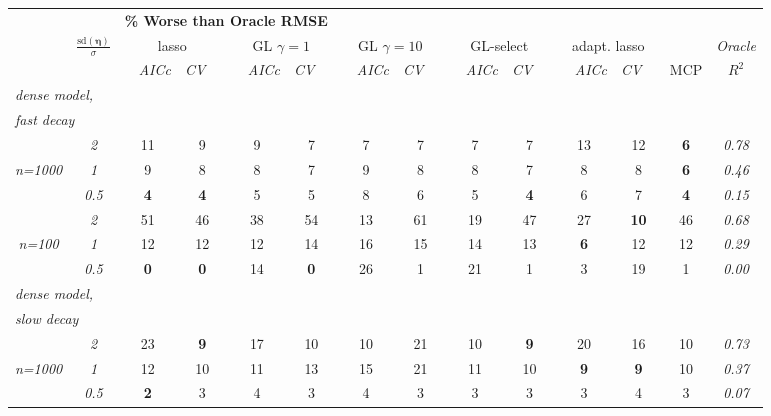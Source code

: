 \documentclass[12pt]{article}
\begin{document}
\begin{table}
\footnotesize
\begin{center}
\begin{tabular}{cc|cc|cc|cc|cc|cc|c|c}
& & \multicolumn{11}{l|}{\bf \% Worse than Oracle RMSE } & \\[1ex]
& \multirow{2}{*}{$\displaystyle\frac{\mathrm{sd}(\boldsymbol{\eta})}{\sigma}$} 
& \multicolumn{2}{c}{lasso} 
& \multicolumn{2}{c}{GL $\gamma=1$} 
& \multicolumn{2}{c}{GL $\gamma=10$} 
& \multicolumn{2}{c}{GL-select} 
& \multicolumn{2}{c}{ adapt. lasso} 
& \multicolumn{1}{c|}{~} & \it Oracle \\[-0.5ex]
& 
& ~~\scriptsize\it AICc & \multicolumn{1}{c}{\scriptsize\it CV~~}
& ~~\scriptsize\it AICc & \multicolumn{1}{c}{\scriptsize\it CV~~}
& ~~\scriptsize\it AICc & \multicolumn{1}{c}{\scriptsize\it CV~~}
& ~~\scriptsize\it AICc & \multicolumn{1}{c}{\scriptsize\it CV~~}
& ~~\scriptsize\it AICc & \multicolumn{1}{c}{\scriptsize\it CV~~} 
& \multicolumn{1}{c|}{ MCP} & $R^2$ \\[1ex]
\hline
\multicolumn{2}{l|}{\it dense model,} &&&&&&&&&&&\\
\multicolumn{2}{l|}{\it fast decay} &&&&&&&&&&&\\& \it  2  & 11 & 9 & 9 & 7 & 7 & 7 & 7 & 7 & 13 & 12 & {\bf 6} & \it  0.78 \\
\it n=1000  & \it  1  & 9 & 8 & 8 & 7 & 9 & 8 & 8 & 7 & 8 & 8 & {\bf 6} & \it  0.46 \\
& \it  0.5  & {\bf 4} & {\bf 4} & 5 & 5 & 8 & 6 & 5 & {\bf 4} & 6 & 7 & {\bf 4} & \it  0.15 \\[1ex]
\cline{2-2}\rule{0pt}{3ex}& \it  2  & 51 & 46 & 38 & 54 & 13 & 61 & 19 & 47 & 27 & {\bf 10} & 46 & \it  0.68 \\
\it n=100  & \it  1  & 12 & 12 & 12 & 14 & 16 & 15 & 14 & 13 & {\bf 6} & 12 & 12 & \it  0.29 \\
& \it  0.5  & {\bf 0} & {\bf 0} & 14 & {\bf 0} & 26 & 1 & 21 & 1 & 3 & 19 & 1 & \it  0.00 \\[1ex]
\hline\multicolumn{2}{l|}{\it dense model,} &&&&&&&&&&&\\
\multicolumn{2}{l|}{\it slow decay} &&&&&&&&&&&\\& \it  2  & 23 & {\bf 9} & 17 & 10 & 10 & 21 & 10 & {\bf 9} & 20 & 16 & 10 & \it  0.73 \\
\it n=1000  & \it  1  & 12 & 10 & 11 & 13 & 15 & 21 & 11 & 10 & {\bf 9} & {\bf 9} & 10 & \it  0.37 \\
& \it  0.5  & {\bf 2} & 3 & 4 & 3 & 4 & 3 & 3 & 3 & 3 & 4 & 3 & \it  0.07 \\[1ex]

\end{tabular}
\end{center}
\end{table}
\end{document}
